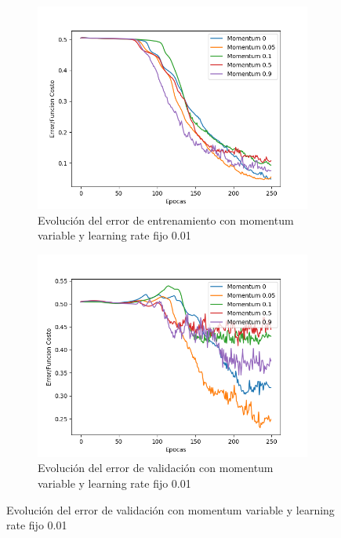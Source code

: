 \begin{figure}[!htbp]
\centering
\begin{subfigure}{.5\textwidth}
  \centering
  \includegraphics[width=1\linewidth]{graficos/eta_x_momentum_promedios_entrenamiento_2.png}
  \caption{Evolución del error de entrenamiento con momentum variable y learning rate fijo 0.01}
  \label{fig:sub1}
\end{subfigure}%
\begin{subfigure}{.5\textwidth}
  \centering
  \includegraphics[width=1\linewidth]{graficos/eta_x_momentum_promedios_validacion_2.png}
  \caption{Evolución del error de validación con momentum variable y learning rate fijo 0.01}
  \label{fig:sub2}
\end{subfigure}
\end{figure}

